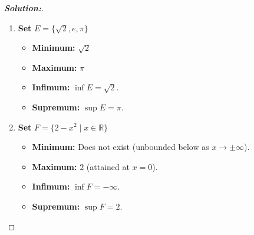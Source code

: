 \documentclass[12pt]{article}
\theoremstyle{definition}\newtheorem{problem}{Problem}
\newenvironment{solution}{\begin{proof}[\bfseries\textup{Solution:}]}{\end{proof}}
\begin{document}
\begin{solution}
\begin{enumerate}
    \item \textbf{Set} \( E = \{ \sqrt{2}, e, \pi \} \)
    \begin{itemize}
        \item \textbf{Minimum:} \( \sqrt{2} \) 
        \item \textbf{Maximum:} \( \pi \) 
        \item \textbf{Infimum:} \( \inf E = \sqrt{2} \).
        \item \textbf{Supremum:} \( \sup E = \pi \).
    \end{itemize}

    \item \textbf{Set} \( F = \{ 2 - x^2 \mid x \in \mathbb{R} \} \)
    \begin{itemize}
        \item \textbf{Minimum:} Does not exist (unbounded below as \( x \to \pm\infty \)).
        \item \textbf{Maximum:} \( 2 \) (attained at \( x = 0 \)).
        \item \textbf{Infimum:} \( \inf F = -\infty \).
        \item \textbf{Supremum:} \( \sup F = 2 \).
    \end{itemize}

\end{enumerate}
\end{solution}
\end{document}
